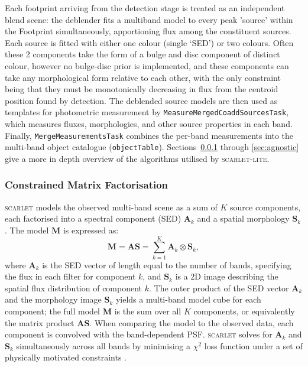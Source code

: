 \documentclass[DM,lsstdraft,authoryear,toc]{lsstdoc}
\newcommand{\scarlet}{\textsc{scarlet}\xspace}
\newcommand{\scarletlite}{\textsc{scarlet-lite}\xspace}
\newcommand{\task}[1]{\texttt{#1}\xspace}
\begin{document}
Each footprint arriving from the detection stage is treated as an independent blend
scene: the deblender fits a multiband model to every peak 'source' within the Footprint
simultaneously, apportioning flux among the constituent sources. Each source is fitted with either one colour (single `SED') or two colours.
Often these 2 components take the form of a bulge and disc component of distinct colour, however no bulge-disc prior is implemented,
and these components can take any morphological form relative to each other,
with the only constraint being that they must be monotonically decreasing in flux from the centroid position found by detection.
The deblended source models are then used as templates for photometric measurement by
\task{MeasureMergedCoaddSourcesTask}, which measures fluxes, morphologies, and other
source properties in each band. Finally, \task{MergeMeasurementsTask} combines
the per-band measurements into the multi-band object catalogue
(\texttt{objectTable}). Sections~\ref{sec:matrix_factorisation} through \ref{sec:agnostic} give a more in depth overview of the algorithms utilised by \scarletlite.

\subsubsection{Constrained Matrix Factorisation}
\label{sec:matrix_factorisation}

\scarlet models the observed multi-band scene as a sum of $K$ source
components, each factorised into a spectral component (SED) $\mathbf{A}_k$
and a spatial morphology $\mathbf{S}_k$. The model $\mathbf{M}$ is expressed
as:
\begin{equation}
  \mathbf{M} = \mathbf{A}\mathbf{S} = \sum_{k=1}^{K} \mathbf{A}_k \otimes \mathbf{S}_k ,
  \label{eq:scarlet_model}
\end{equation}
where $\mathbf{A}_k$ is the SED vector of length equal to the number of
bands, specifying the flux in each filter for component $k$, and
$\mathbf{S}_k$ is a 2D image describing the spatial flux distribution of
component $k$. The outer product of the SED vector $\mathbf{A}_k$ and the
morphology image $\mathbf{S}_k$ yields a multi-band model cube for each
component; the full model $\mathbf{M}$ is the sum over all $K$ components,
or equivalently the matrix product $\mathbf{AS}$. When comparing the model
to the observed data, each component is convolved with the band-dependent
PSF\@. \scarlet solves for $\mathbf{A}_k$ and $\mathbf{S}_k$ simultaneously
across all bands by minimising a $\chi^2$ loss function under a set of
physically motivated constraints \citep{Melchior2018}.
\end{document}
